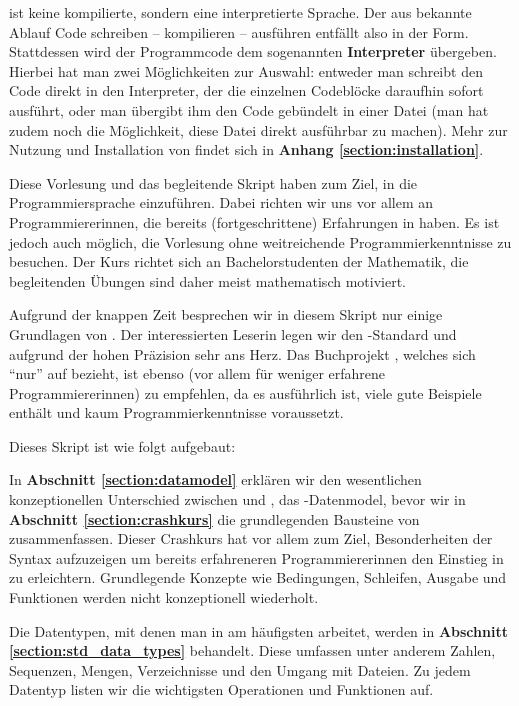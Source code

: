 \Python ist keine kompilierte, sondern eine interpretierte Sprache. Der aus \CC bekannte Ablauf Code schreiben -- kompilieren -- 
ausführen entfällt also in der Form. Stattdessen wird der Programmcode dem sogenannten \textbf{Interpreter} übergeben. Hierbei hat man 
zwei Möglichkeiten zur Auswahl: entweder man schreibt den Code direkt in den Interpreter, der die einzelnen Codeblöcke daraufhin sofort 
ausführt, oder man übergibt ihm den Code gebündelt in einer Datei (man hat zudem noch die Möglichkeit, diese Datei direkt ausführbar 
zu machen). Mehr zur Nutzung und Installation von \Python findet sich in \textbf{Anhang \ref{section:installation}}. 

Diese Vorlesung und das begleitende Skript haben zum Ziel, in die Programmiersprache \PythonDrei einzuführen. Dabei richten wir uns 
vor allem an Programmiererinnen, die bereits (fortgeschrittene) Erfahrungen in \CC haben. Es ist jedoch auch möglich, die Vorlesung 
ohne weitreichende Programmierkenntnisse zu besuchen. Der Kurs richtet sich an Bachelorstudenten der Mathematik, die begleitenden 
Übungen sind daher meist mathematisch motiviert.

Aufgrund der knappen Zeit besprechen wir in diesem Skript nur einige Grundlagen von \Python.
Der interessierten Leserin legen wir den \Python-Standard \cite{Python2} und \cite{Python3} aufgrund der hohen Präzision sehr ans Herz.
Das Buchprojekt \cite{LottPython}, welches sich ``nur'' auf \PythonZwei bezieht, ist ebenso (vor allem für weniger erfahrene 
Programmiererinnen) zu empfehlen, da es ausführlich ist, viele gute Beispiele enthält und kaum Programmierkenntnisse voraussetzt.

\vspace{1em}

Dieses Skript ist wie folgt aufgebaut:

In \textbf{Abschnitt \ref{section:datamodel}} erklären wir den wesentlichen konzeptionellen Unterschied zwischen \Python und 
\CC, das \Python-Datenmodel, bevor wir in \textbf{Abschnitt \ref{section:crashkurs}} die grundlegenden 
Bausteine von \Python zusammenfassen. Dieser Crashkurs hat vor allem zum Ziel, Besonderheiten der Syntax aufzuzeigen um bereits 
erfahreneren Programmiererinnen den Einstieg in \Python zu erleichtern. Grundlegende Konzepte wie Bedingungen, Schleifen, Ausgabe 
und Funktionen werden nicht konzeptionell wiederholt.

Die Datentypen, mit denen man in \Python am häufigsten arbeitet, werden in \textbf{Abschnitt \ref{section:std_data_types}} behandelt.
Diese umfassen unter anderem Zahlen, Sequenzen, Mengen, Verzeichnisse und den Umgang mit Dateien. Zu jedem Datentyp listen wir die 
wichtigsten Operationen und Funktionen auf.

